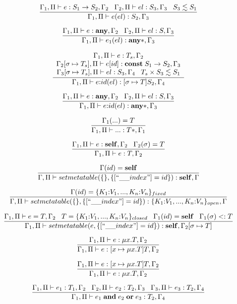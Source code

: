 \[
\dfrac{\Gamma_{1}, \Pi \vdash e:S_{1} \rightarrow S_{2}, \Gamma_{2} \;\;\;
       \Gamma_{2}, \Pi \vdash el:S_{3}, \Gamma_{3} \;\;\;
       S_{3} \lesssim S_{1}}
      {\Gamma_{1}, \Pi \vdash e(el):S_{2}, \Gamma_{3}}
\]

\[
\dfrac{\Gamma_{1}, \Pi \vdash e:\mathbf{any}, \Gamma_{2} \;\;\;
       \Gamma_{2}, \Pi \vdash el:S, \Gamma_{3}}
      {\Gamma_{1}, \Pi \vdash e_{1}(el):\mathbf{any}{*}, \Gamma_{3}}
\]

\[
\dfrac{\begin{array}{c}
       \Gamma_{1}, \Pi \vdash e:T_{s}, \Gamma_{2}\\
       \Gamma_{2}[\sigma \mapsto T_{s}], \Pi \vdash e[id]:\mathbf{const} \; S_{1} \rightarrow S_{2}, \Gamma_{3}\\
       \Gamma_{3}[\sigma \mapsto T_{s}], \Pi \vdash el:S_{3}, \Gamma_{4} \;\;\;
       T_{s} \times S_{3} \lesssim S_{1}
       \end{array}}
      {\Gamma_{1}, \Pi \vdash e{:}id(el):[\sigma \mapsto T]S_{2}, \Gamma_{4}}
\]

\[
\dfrac{\Gamma_{1}, \Pi \vdash e:\mathbf{any}, \Gamma_{2} \;\;\;
       \Gamma_{2}, \Pi \vdash el:S, \Gamma_{3}}
      {\Gamma_{1}, \Pi \vdash e{:}id(el):\mathbf{any}{*}, \Gamma_{3}}
\]

\[
\dfrac{\Gamma_{1}({...}) = T}
      {\Gamma_{1}, \Pi \vdash {...}:T{*}, \Gamma_{1}}
\]

\[
\dfrac{\Gamma_{1}, \Pi \vdash e:\mathbf{self}, \Gamma_{2} \;\;\;
       \Gamma_{2}(\sigma) = T}
      {\Gamma_{1}, \Pi \vdash e:T, \Gamma_{2}}
\]

\[
\dfrac{\env(id) = \Self}
      {\env, \penv \vdash setmetatable(\{\}, \{[``\string_\string_index"] = id\}):\Self, \env}
\]

\[
\dfrac{\env(id) = \{K_{1}{:}V_{1}, ..., K_{n}{:}V_{n}\}_{fixed}}
      {\env, \penv \vdash setmetatable(\{\}, \{[``\string_\string_index"] = id\}):\{K_{1}{:}V_{1}, ..., K_{n}{:}V_{n}\}_{open}, \env}
\]

\[
\dfrac{\env_{1}, \penv \vdash e = T, \env_{2} \;\;\;
       T = \{K_{1}{:}V_{1}, ..., K_{n}{:}V_{n}\}_{closed} \;\;\;
       \env_{1}(id) = \Self \;\;\; \env_{1}(\sigma) \subtype T}
      {\env_{1}, \penv \vdash setmetatable(e, \{[``\string_\string_index"] = id\}):\Self, \env_{2}[\sigma \mapsto T]}
\]

\[
\dfrac{\Gamma_{1}, \Pi \vdash e:\mu x.T, \Gamma_{2}}
      {\Gamma_{1}, \Pi \vdash e:[x \mapsto \mu x.T]T, \Gamma_{2}}
\]

\[
\dfrac{\Gamma_{1}, \Pi \vdash e:[x \mapsto \mu x.T]T, \Gamma_{2}}
      {\Gamma_{1}, \Pi \vdash e:\mu x.T, \Gamma_{2}}
\]

\[
\dfrac{\Gamma_{1}, \Pi \vdash e_{1}:T_{1}, \Gamma_{2} \;\;\;
       \Gamma_{2}, \Pi \vdash e_{2}:T_{2}, \Gamma_{3} \;\;\;
       \Gamma_{3}, \Pi \vdash e_{3}:T_{2}, \Gamma_{4}}
      {\Gamma_{1}, \Pi \vdash e_{1} \; \mathbf{and} \; e_{2} \; \mathbf{or} \; e_{3}:T_{2}, \Gamma_{4}}
\]

